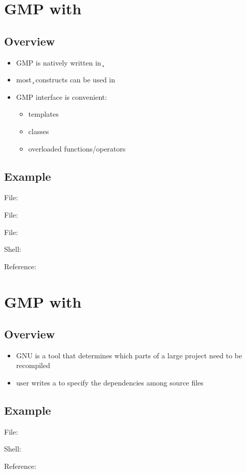 \section{GMP with \cpp}

\subsection{Overview}

\begin{itemize}
\item GMP is natively written in \c
\item most \c{} constructs can be used in \cpp
\item GMP \cpp{} interface is convenient:
  \begin{itemize}
  \item templates
  \item classes
  \item overloaded functions/operators
  \end{itemize}
\end{itemize}

\subsection{Example}

File: 
\codes{}

File: 
\codes{}

File: 
\codes{}

Shell:
\codes{}

Reference: \cite{gmp}


\section{GMP with \make}

\subsection{Overview}

\begin{itemize}
\item GNU \make{} is a tool that determines
  which parts of a large project need to be recompiled
\item user writes a  to specify
  the dependencies among source files
\end{itemize}

\subsection{Example}

File: 
\codes{}

Shell:
\codes{}

Reference: \cite{make}
